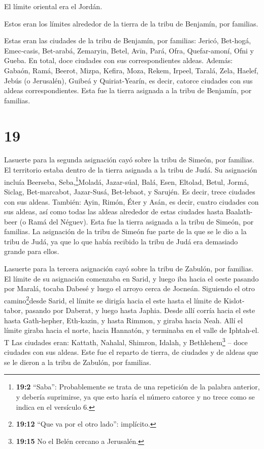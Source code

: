  El límite oriental era el Jordán.

Estos eran los límites alrededor de la tierra de la tribu de Benjamín,
por familias.

 Estas eran las ciudades de la tribu de Benjamín, por
familias: Jericó, Bet-hogá, Emec-casis,  Bet-arabá,
Zemaryin, Betel,  Avīn, Pará, Ofra, 
Quefar-amoní, Ofni y Gueba. En total, doce ciudades con sus
correspondientes aldeas.  Además: Gabaón, Ramá, Beerot,
 Mizpa, Kefira, Moza,  Rekem, Irpeel, Taralá,
 Zela, Haelef, Jebús (o Jerusalén), Guibeá y
Quiriat-Yearín, es decir, catorce ciudades con sus aldeas
correspondientes. Esta fue la tierra asignada a la tribu de Benjamín,
por familias.

\hypertarget{section-18}{%
\section{19}\label{section-18}}

 Lasuerte para la segunda asignación cayó sobre la tribu de
Simeón, por familias. El territorio estaba dentro de la tierra asignada
a la tribu de Judá.  Su asignación incluía Beerseba,
Seba,\footnote{\textbf{19:2} ``Saba'': Probablemente se trata de una
  repetición de la palabra anterior, y debería suprimirse, ya que esto
  haría el número catorce y no trece como se indica en el versículo 6.}Moladá,
 Jazar-súal, Balá, Esen,  Eltolad, Betul, Jormá,
 Siclag, Bet-marcabot, Jazar-Susá,  Bet-lebaot,
y Sarujén. Es decir, trece ciudades con sus aldeas. 
También: Ayin, Rimón, Éter y Asán, es decir, cuatro ciudades con sus
aldeas,  así como todas las aldeas alrededor de estas
ciudades hasta Baalath-beer (o Ramá del Néguev). Esta fue la tierra
asignada a la tribu de Simeón, por familias.  La asignación
de la tribu de Simeón fue parte de la que se le dio a la tribu de Judá,
ya que lo que había recibido la tribu de Judá era demasiado grande para
ellos.

 Lasuerte para la tercera asignación cayó sobre la tribu de
Zabulón, por familias. El límite de su asignación comenzaba en Sarid,
 y luego iba hacia el oeste pasando por Maralá, tocaba
Dabesé y luego el arroyo cerca de Jocneán.  Siguiendo el
otro camino\footnote{\textbf{19:12} ``Que va por el otro lado'':
  implícito.}desde Sarid, el límite se dirigía hacia el este hasta el
límite de Kislot-tabor, pasando por Daberat, y luego hasta Japhia.
 Desde allí corría hacia el este hasta Gath-hepher,
Eth-kazin, y hasta Rimmon, y giraba hacia Neah.  Allí el
límite giraba hacia el norte, hacia Hannatón, y terminaba en el valle de
Iphtah-el.  T Las ciudades eran: Kattath, Nahalal, Shimron,
Idalah, y Bethlehem\footnote{\textbf{19:15} No el Belén cercano a
  Jerusalén.} -- doce ciudades con sus aldeas.  Este fue el
reparto de tierra, de ciudades y de aldeas que se le dieron a la tribu
de Zabulón, por familias.

